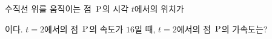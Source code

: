 수직선 위를 움직이는 점~$\mathrm{P}$의 시각 $t$에서의 위치가 \par\smallskip{}\par\smallskip\noindent 이다. $t=2$에서의 점~$\mathrm{P}$의 속도가 $16$일 때, $t=2$에서의 점~$\mathrm{P}$의 가속도는? 

